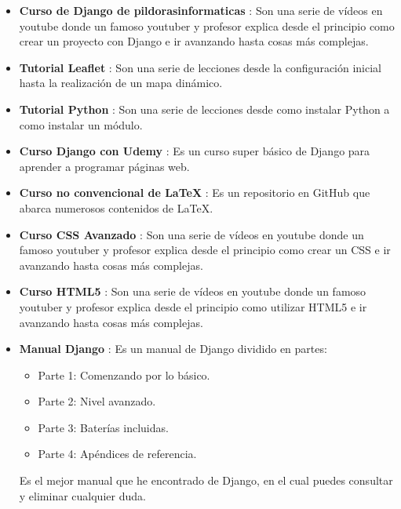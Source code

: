 \begin{itemize}
	\item \textbf{Curso de Django de pildorasinformaticas} \cite{djangoPildoras}: Son una serie de vídeos en youtube donde un famoso youtuber y profesor explica desde el principio como crear un proyecto con Django e ir avanzando hasta cosas más complejas.
	\item \textbf{Tutorial Leaflet} \cite{tutorialLeaflet}: Son una serie de lecciones desde la configuración inicial hasta la realización de un mapa dinámico. 
	\item \textbf{Tutorial Python} \cite{tutorialPython}: Son una serie de lecciones desde como instalar Python a como instalar un módulo. 
	\item \textbf{Curso Django con Udemy} \cite{udemy}: Es un curso super básico de Django para aprender a programar páginas web.
	\item \textbf{Curso no convencional de LaTeX} \cite{cursoLatex}: Es un repositorio en GitHub que abarca numerosos contenidos de LaTeX. 
	\item \textbf{Curso CSS Avanzado} \cite{cursoCss}: Son una serie de vídeos en youtube donde un famoso youtuber y profesor explica desde el principio como crear un CSS e ir avanzando hasta cosas más complejas.
	\item \textbf{Curso HTML5} \cite{cursoHTML}: Son una serie de vídeos en youtube donde un famoso youtuber y profesor explica desde el principio como utilizar HTML5 e ir avanzando hasta cosas más complejas.
	\item \textbf{Manual Django} \cite{manualDjango}: Es un manual de Django dividido en partes:
	\begin{itemize} 
		\item Parte 1: Comenzando por lo básico.
		\item Parte 2: Nivel avanzado.
		\item Parte 3: Baterías incluidas.
		\item Parte 4: Apéndices de referencia.
	\end{itemize}
	Es el mejor manual que he encontrado de Django, en el cual puedes consultar y eliminar cualquier duda.
\end{itemize}